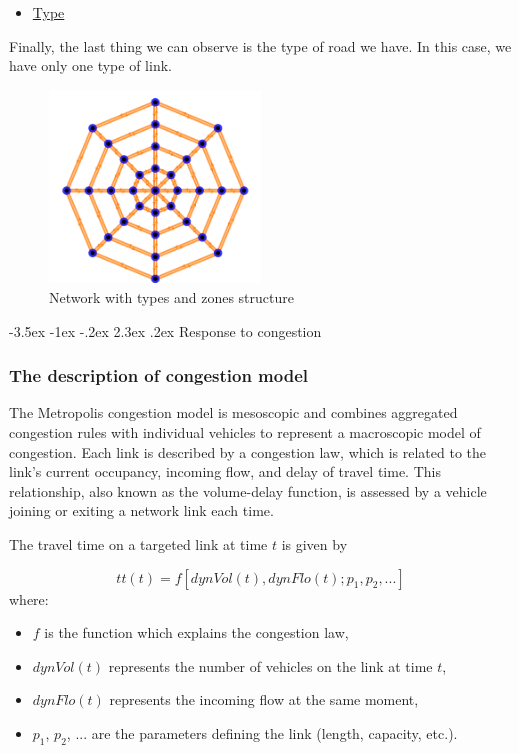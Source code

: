 \documentclass[a4paper, 12pt,oneside]{article}
\makeatletter
\renewcommand{\subsection}{\@startsection {subsection}{1}{\z@}%
             {-3.5ex \@plus -1ex \@minus -.2ex}%
             {2.3ex \@plus.2ex}%
             {\normalfont\normalsize\bfseries}}
\makeatother
\begin{document}
\begin{itemize}
    \item \underline{Type}
\end{itemize}

Finally, the last thing we can observe is the type of road we have.
In this case, we have only one type of link.

\begin{figure}[H]
    \centering
    \includegraphics[width=0.5\textwidth]{Images/capture zone type.png}
    \caption{Network with types and zones structure}
\end{figure}




\subsection{Response to congestion}

\subsubsection{The description of congestion model}
The Metropolis congestion model is mesoscopic and combines aggregated congestion rules with individual vehicles to represent a macroscopic model of congestion. Each link is described by a congestion law, which is related to the link's current occupancy, incoming flow, and delay of travel time. This relationship, also known as the volume-delay function, is assessed by a vehicle joining or exiting a network link each time.

The travel time on a targeted link at time $t$ is given by

\begin{equation}
    tt(t)=f[dynVol(t), dynFlo(t); p_1, p_2, ...]
    \end{equation}
where:

\begin{itemize}
    \item $f$ is the function which explains the congestion law,
    \item $dynVol(t)$ represents the number of vehicles on the link at time $t$,
    \item $dynFlo(t)$ represents the incoming flow at the same moment,
    \item $p_1$, $p_2$, ... are the parameters defining the link (length, capacity, etc.).
\end{itemize}
\end{document}
